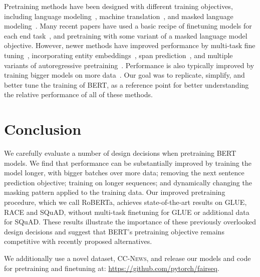 Pretraining methods have been designed with different training objectives, including language modeling~\cite{dai2015semi,peters2018deep,howard2018universal},  machine translation~\cite{mccann2017learned}, and masked language modeling~\cite{devlin2018bert,lample2019cross}. Many recent papers have used a basic recipe of  finetuning models for each end task~\cite{howard2018universal,radford2018gpt}, and pretraining with some variant of a masked language model objective.  However, newer methods have improved performance by multi-task fine tuning~\cite{dong2019unified}, incorporating entity embeddings~\cite{sun2019ernie}, span prediction~\cite{joshi2019spanbert}, and multiple variants of autoregressive pretraining~\cite{song2019mass,chan2019kermit,yang2019xlnet}.  Performance is also typically improved by training bigger models on more data~\cite{devlin2018bert,baevski2019cloze,yang2019xlnet,radford2019language}. Our goal was to replicate, simplify, and better tune the training of BERT, as a reference point for better understanding the relative performance of all of these methods. 

\section{Conclusion} \label{sec:conclusion}

We carefully evaluate a number of design decisions when pretraining BERT models. We find that performance can be substantially improved by training the model longer, with bigger batches over more data; removing the next sentence prediction objective; training on longer sequences; and dynamically changing the masking pattern applied to the training data. Our improved pretraining procedure, which we call RoBERTa, achieves state-of-the-art results on GLUE, RACE and SQuAD, without multi-task finetuning for GLUE or additional data for SQuAD. These results illustrate the importance of these previously overlooked design decisions and suggest that BERT's pretraining objective remains competitive with recently proposed alternatives.

We additionally use a novel dataset, \textsc{CC-News}, and release our models and code for pretraining and finetuning at: \url{https://github.com/pytorch/fairseq}.


